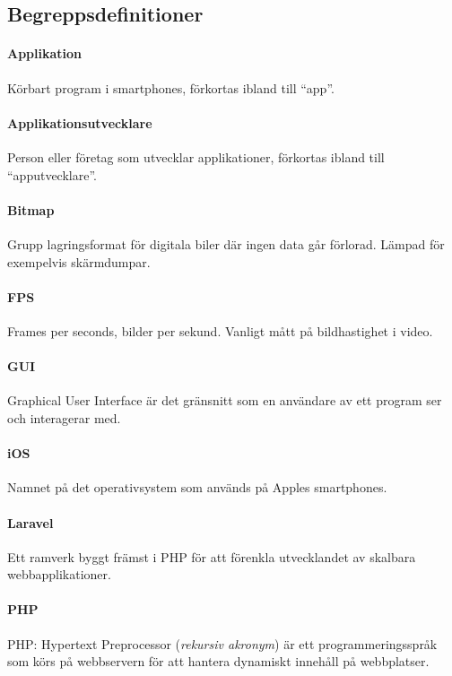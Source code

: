 \subsection{Begreppsdefinitioner}

\paragraph{Applikation} Körbart program i smartphones, förkortas ibland till ``app''.

\paragraph{Applikationsutvecklare} Person eller företag som utvecklar applikationer, förkortas  ibland till ``apputvecklare''.

\paragraph{Bitmap} Grupp lagringsformat för digitala biler där ingen data går förlorad. Lämpad för exempelvis skärmdumpar.

\paragraph{FPS} Frames per seconds, bilder per sekund. Vanligt mått på bildhastighet i video.

\paragraph{GUI} Graphical User Interface är det gränsnitt som en användare av ett program ser och interagerar med.

\paragraph{iOS} Namnet på det operativsystem som används på Apples smartphones.

\paragraph{Laravel} Ett ramverk byggt främst i PHP för att förenkla utvecklandet av skalbara webbapplikationer\parencite{laravel}.

\paragraph{PHP} PHP: Hypertext Preprocessor (\textit{rekursiv akronym}) är ett programmeringsspråk som körs på webbservern för att hantera dynamiskt innehåll på webbplatser.

